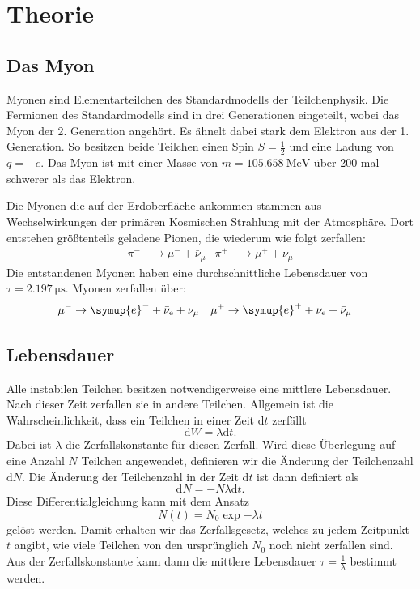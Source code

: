 \section{Theorie}
\label{sec:Theorie}

\subsection{Das Myon}
\label{ssec:myon}

Myonen sind Elementarteilchen des Standardmodells der Teilchenphysik.
Die Fermionen des Standardmodells sind in drei Generationen eingeteilt, wobei das Myon der 2. Generation angehört.
Es ähnelt dabei stark dem Elektron aus der 1. Generation. 
So besitzen beide Teilchen einen Spin $S = \frac{1}{2}$ und eine Ladung von $q = -e$.
Das Myon ist mit einer Masse von $m = \qty{105.658}{\MeV}$ über 200 mal schwerer als das Elektron.

Die Myonen die auf der Erdoberfläche ankommen stammen aus Wechselwirkungen der primären Kosmischen Strahlung mit der Atmosphäre.
Dort entstehen größtenteils geladene Pionen, die wiederum wie folgt zerfallen:
\begin{align*}
    \pi^- &\rightarrow \mu^- + \bar{\nu}_{\mu} & \pi^+ &\rightarrow \mu^+ + \nu_{\mu}
\end{align*}
Die entstandenen Myonen haben eine durchschnittliche Lebensdauer von $\tau = \qty{2.197}{\micro\second}$.
Myonen zerfallen über:
\begin{align*}
    \mu^- &\rightarrow \symup{e}^- + \bar{\nu}_\text{e} + \nu_{\mu} & \mu^+ &\rightarrow \symup{e}^+ + \nu_{\text{e}} + \bar{\nu}_{\mu}
\end{align*}
\subsection{Lebensdauer}
\label{ssec:lebensdauer}

Alle instabilen Teilchen besitzen notwendigerweise eine mittlere Lebensdauer.
Nach dieser Zeit zerfallen sie in andere Teilchen.
Allgemein ist die Wahrscheinlichkeit, dass ein Teilchen in einer Zeit $\text{d}t$ zerfällt 
\begin{equation}
    \text{d}W = \lambda \text{d}t.
\end{equation}
Dabei ist $\lambda$ die Zerfallskonstante für diesen Zerfall.
Wird diese Überlegung auf eine Anzahl $N$ Teilchen angewendet, definieren wir die Änderung der Teilchenzahl $\text{d}N$.
Die Änderung der Teilchenzahl in der Zeit $\text{d}t$ ist dann definiert als
\begin{equation}
    \text{d}N = - N \lambda \text{d}t.
\end{equation}
Diese Differentialgleichung kann mit dem Ansatz 
\begin{equation}
    N(t) = N_0 \exp{- \lambda t}
\end{equation}
gelöst werden.
Damit erhalten wir das Zerfallsgesetz, welches zu jedem Zeitpunkt $t$ angibt, wie viele Teilchen von den ursprünglich $N_0$ noch nicht zerfallen sind.
Aus der Zerfallskonstante kann dann die mittlere Lebensdauer $\tau = \frac{1}{\lambda}$ bestimmt werden.

